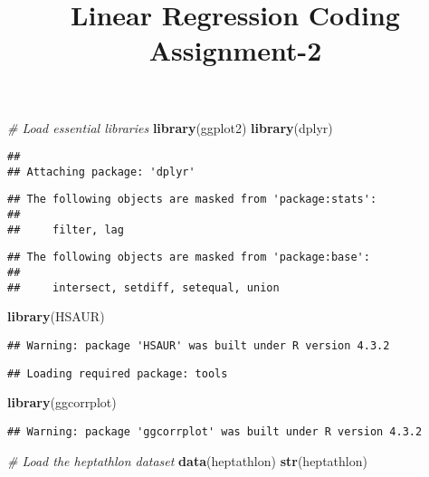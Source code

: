 \documentclass[
]{article}
\title{Linear Regression Coding Assignment-2}
\author{}
\date{\vspace{-2.5em}}
\newenvironment{Shaded}{\begin{snugshade}}{\end{snugshade}}
\newcommand{\CommentTok}[1]{\textcolor[rgb]{0.56,0.35,0.01}{\textit{#1}}}
\newcommand{\FunctionTok}[1]{\textcolor[rgb]{0.13,0.29,0.53}{\textbf{#1}}}
\newcommand{\NormalTok}[1]{#1}
\begin{document}
\maketitle

\begin{Shaded}
\begin{Highlighting}[]
\CommentTok{\# Load essential libraries}
\FunctionTok{library}\NormalTok{(ggplot2)}
\FunctionTok{library}\NormalTok{(dplyr)}
\end{Highlighting}
\end{Shaded}

\begin{verbatim}
## 
## Attaching package: 'dplyr'
\end{verbatim}

\begin{verbatim}
## The following objects are masked from 'package:stats':
## 
##     filter, lag
\end{verbatim}

\begin{verbatim}
## The following objects are masked from 'package:base':
## 
##     intersect, setdiff, setequal, union
\end{verbatim}

\begin{Shaded}
\begin{Highlighting}[]
\FunctionTok{library}\NormalTok{(HSAUR)}
\end{Highlighting}
\end{Shaded}

\begin{verbatim}
## Warning: package 'HSAUR' was built under R version 4.3.2
\end{verbatim}

\begin{verbatim}
## Loading required package: tools
\end{verbatim}

\begin{Shaded}
\begin{Highlighting}[]
\FunctionTok{library}\NormalTok{(ggcorrplot)}
\end{Highlighting}
\end{Shaded}

\begin{verbatim}
## Warning: package 'ggcorrplot' was built under R version 4.3.2
\end{verbatim}

\begin{Shaded}
\begin{Highlighting}[]
\CommentTok{\# Load the heptathlon dataset}
\FunctionTok{data}\NormalTok{(heptathlon)}
\FunctionTok{str}\NormalTok{(heptathlon)}
\end{Highlighting}
\end{Shaded}
\end{document}
